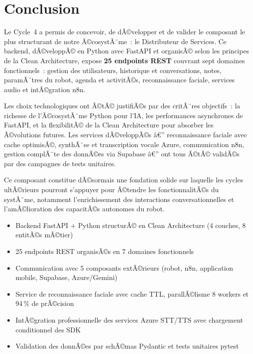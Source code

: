\section{Conclusion}

Le Cycle~4 a permis de concevoir, de dÃ©velopper et de valider
le composant le plus structurant de notre Ã©cosystÃ¨me~: le
Distributeur de Services. Ce backend, dÃ©veloppÃ© en Python avec
FastAPI et organisÃ© selon les principes de la Clean Architecture,
expose \textbf{25 endpoints REST} couvrant sept domaines
fonctionnels~: gestion des utilisateurs, historique et
conversations, notes, paramÃ¨tres du robot, agenda et activitÃ©s,
reconnaissance faciale, services audio et intÃ©gration n8n.

Les choix technologiques ont Ã©tÃ© justifiÃ©s par des critÃ¨res
objectifs~: la richesse de l'Ã©cosystÃ¨me Python pour l'IA, les
performances asynchrones de FastAPI, et la flexibilitÃ© de la
Clean Architecture pour absorber les Ã©volutions futures.
Les services dÃ©veloppÃ©s â€” reconnaissance faciale avec cache
optimisÃ©, synthÃ¨se et transcription vocale Azure, communication
n8n, gestion complÃ¨te des donnÃ©es via Supabase â€” ont tous Ã©tÃ©
validÃ©s par des campagnes de tests unitaires.

Ce composant constitue dÃ©sormais une fondation solide sur
laquelle les cycles ultÃ©rieurs pourront s'appuyer pour Ã©tendre
les fonctionnalitÃ©s du systÃ¨me, notamment l'enrichissement des
interactions conversationnelles et l'amÃ©lioration des capacitÃ©s
autonomes du robot.

\begin{tcolorbox}[colback=blue!5!white, colframe=blue!60!black,
  title=\textbf{Points clÃ©s du Cycle 4}]
\begin{itemize}[noitemsep]
  \item Backend FastAPI + Python structurÃ© en Clean Architecture
        (4 couches, 8 entitÃ©s mÃ©tier)
  \item 25 endpoints REST organisÃ©s en 7 domaines fonctionnels
  \item Communication avec 5 composants extÃ©rieurs
        (robot, n8n, application mobile, Supabase, Azure/Gemini)
  \item Service de reconnaissance faciale avec cache TTL,
        parallÃ©lisme 8 workers et 94\,\% de prÃ©cision
  \item IntÃ©gration professionnelle des services Azure STT/TTS
        avec chargement conditionnel des SDK
  \item Validation des donnÃ©es par schÃ©mas Pydantic et
        tests unitaires pytest
\end{itemize}
\end{tcolorbox}
